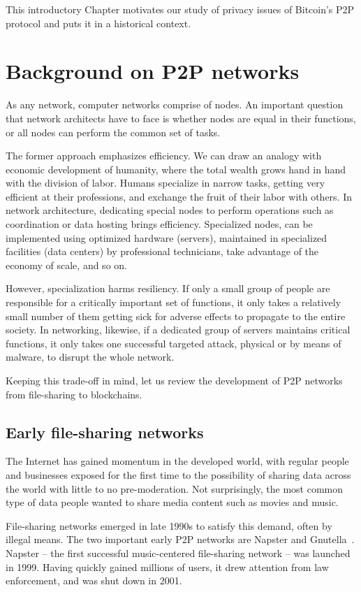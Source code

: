 This introductory Chapter motivates our study of privacy issues of Bitcoin's P2P protocol and puts it in a historical context.


\section{Background on P2P networks}

As any network, computer networks comprise of nodes.
An important question that network architects have to face is whether nodes are equal in their functions, or all nodes can perform the common set of tasks.

The former approach emphasizes efficiency.
We can draw an analogy with economic development of humanity, where the total wealth grows hand in hand with the division of labor.
Humans specialize in narrow tasks, getting very efficient at their professions, and exchange the fruit of their labor with others.
In network architecture, dedicating special nodes to perform operations such as coordination or data hosting brings efficiency.
Specialized nodes, can be implemented using optimized hardware (servers), maintained in specialized facilities (data centers) by professional technicians, take advantage of the economy of scale, and so on.

However, specialization harms resiliency.
If only a small group of people are responsible for a critically important set of functions, it only takes a relatively small number of them getting sick for adverse effects to propagate to the entire society.
In networking, likewise, if a dedicated group of servers maintains critical functions, it only takes one successful targeted attack, physical or by means of malware, to disrupt the whole network.

Keeping this trade-off in mind, let us review the development of P2P networks from file-sharing to blockchains.


\subsection{Early file-sharing networks}

The Internet has gained momentum in the developed world, with regular people and businesses exposed for the first time to the possibility of sharing data across the world with little to no pre-moderation.
Not surprisingly, the most common type of data people wanted to share media content such as movies and music.

File-sharing networks emerged in late 1990s to satisfy this demand, often by illegal means.
The two important early P2P networks are Napster and Gnutella~\cite{Saroiu2003}.
Napster -- the first successful music-centered file-sharing network -- was launched in 1999.
Having quickly gained millions of users, it drew attention from law enforcement, and was shut down in 2001.

